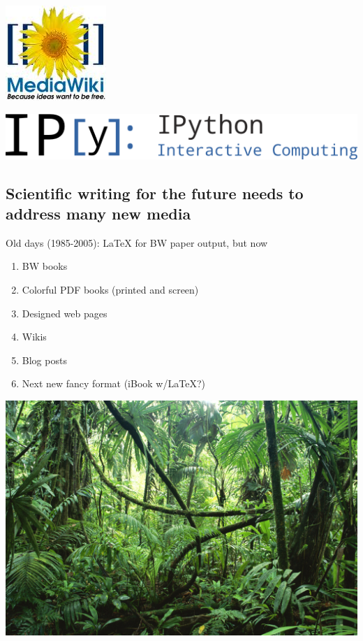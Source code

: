 \documentclass[%
oneside,                 %
final,                   %
10pt]{article}
\begin{document}
\vspace{6mm}
\vspace{6mm}
\centerline{\includegraphics[width=0.2\linewidth]{testfigs/MediaWiki_logo.jpg}}
\vspace{6mm}
\vspace{6mm}
\centerline{\includegraphics[width=0.6\linewidth]{testfigs/IPython_logo.png}}
\vspace{6mm}
\subsection{Scientific writing for the future needs to address many new media}
Old days (1985-2005): {\LaTeX} for BW paper output, but now
\begin{enumerate}
  \item BW books
  \item Colorful PDF books (printed and screen)
  \item Designed web pages
  \item Wikis
  \item Blog posts
  \item Next new fancy format (iBook w/LaTeX?)
\end{enumerate}
\noindent
\vspace{6mm}
\centerline{\includegraphics[width=0.9\linewidth]{testfigs/jungle_with_mess.jpg}}
\vspace{6mm}
\end{document}
